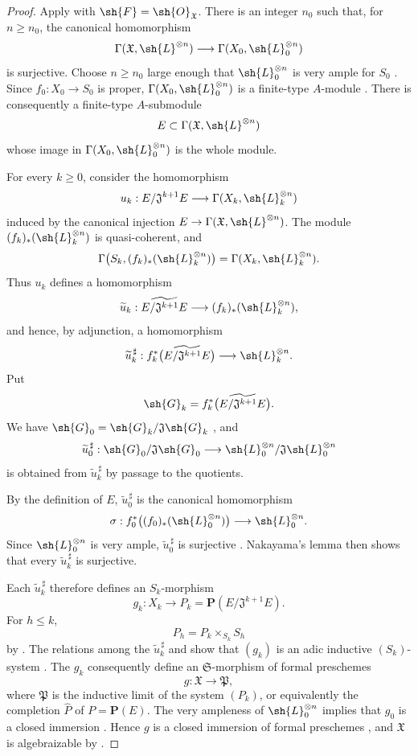 \begin{proof}
Apply  with
$\sh{F}=\sh{O}_{\mathfrak{X}}$.  There is an integer $n_0$ such
that, for $n\geq n_0$, the canonical homomorphism
\[
  \Gamma(\mathfrak{X},\sh{L}^{\otimes n})
  \longrightarrow
  \Gamma(X_0,\sh{L}_0^{\otimes n})
\]
is surjective.  Choose $n\geq n_0$ large enough that
$\sh{L}_0^{\otimes n}$ is very ample for $S_0$
.  Since
$f_0:X_0\to S_0$ is proper,
$\Gamma(X_0,\sh{L}_0^{\otimes n})$ is a finite-type $A$-module
.  There is consequently a finite-type
$A$-submodule
\[
  E\subset\Gamma(\mathfrak{X},\sh{L}^{\otimes n})
\]
whose image in $\Gamma(X_0,\sh{L}_0^{\otimes n})$ is the whole
module.

For every $k\geq0$, consider the homomorphism
\[
  u_k:
  E/\mathfrak{J}^{k+1}E
  \longrightarrow
  \Gamma(X_k,\sh{L}_k^{\otimes n})
\]
induced by the canonical injection
$E\to\Gamma(\mathfrak{X},\sh{L}^{\otimes n})$.  The module
$(f_k)_*(\sh{L}_k^{\otimes n})$ is quasi-coherent, and
\[
  \Gamma\bigl(S_k,(f_k)_*(\sh{L}_k^{\otimes n})\bigr)
  =
  \Gamma(X_k,\sh{L}_k^{\otimes n}).
\]
Thus $u_k$ defines a homomorphism
\[
  \widetilde{u}_k:
  \widetilde{E/\mathfrak{J}^{k+1}E}
  \longrightarrow
  (f_k)_*(\sh{L}_k^{\otimes n}),
\]
and hence, by adjunction, a homomorphism
\[
  \widetilde{u}_k^{\,\sharp}:
  f_k^*\bigl(\widetilde{E/\mathfrak{J}^{k+1}E}\bigr)
  \longrightarrow
  \sh{L}_k^{\otimes n}.
\]
Put
\[
  \sh{G}_k=
  f_k^*\bigl(\widetilde{E/\mathfrak{J}^{k+1}E}\bigr).
\]
We have
$\sh{G}_0=\sh{G}_k/\mathfrak{J}\sh{G}_k$
, and
\[
  \widetilde{u}_0^{\,\sharp}:
  \sh{G}_0/\mathfrak{J}\sh{G}_0
  \longrightarrow
  \sh{L}_0^{\otimes n}/
  \mathfrak{J}\sh{L}_0^{\otimes n}
\]
is obtained from $\widetilde{u}_k^{\,\sharp}$ by passage to the
quotients.

By the definition of $E$, $\widetilde{u}_0^{\,\sharp}$ is the
canonical homomorphism
\[
  \sigma:
  f_0^*\bigl((f_0)_*(\sh{L}_0^{\otimes n})\bigr)
  \longrightarrow
  \sh{L}_0^{\otimes n}.
\]
Since $\sh{L}_0^{\otimes n}$ is very ample,
$\widetilde{u}_0^{\,\sharp}$ is surjective
.  Nakayama's lemma then shows that every
$\widetilde{u}_k^{\,\sharp}$ is surjective.

Each $\widetilde{u}_k^{\,\sharp}$ therefore defines
 an $S_k$-morphism
\[
  g_k:X_k\longrightarrow
  P_k=\mathbf{P}(E/\mathfrak{J}^{k+1}E).
\]
For $h\leq k$,
\[
  P_h=P_k\times_{S_k}S_h
\]
by .  The relations among the
$\widetilde{u}_k^{\,\sharp}$ and  show that
$(g_k)$ is an adic inductive $(S_k)$-system
.  The $g_k$ consequently define an
$\mathfrak{S}$-morphism of formal preschemes
\[
  g:\mathfrak{X}\longrightarrow\mathfrak{P},
\]
where $\mathfrak{P}$ is the inductive limit of the system $(P_k)$,
or equivalently the completion $\widehat{P}$ of
$P=\mathbf{P}(E)$.  The very ampleness of
$\sh{L}_0^{\otimes n}$ implies that $g_0$ is a closed immersion
.  Hence $g$ is a closed immersion of formal
preschemes , and $\mathfrak{X}$ is algebraizable
by .


\end{proof}

